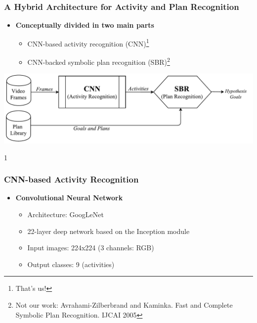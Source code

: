 \documentclass[usenames,dvipsnames]{beamer}
\def\masterclass{1}
\def\masterclass{0}
\begin{document}
\begin{frame}[c]\frametitle{A Hybrid Architecture for Activity and Plan Recognition}
   	\begin{itemize}
   		\item \textbf{Conceptually divided in two main parts}
   		\begin{itemize}
				\item CNN-based activity recognition (CNN)\footnote{That's us!}
                \item CNN-backed symbolic plan recognition (SBR)\footnote{Not our work: Avrahami-Zilberbrand and Kaminka. Fast and Complete Symbolic Plan Recognition. IJCAI 2005}
	    \end{itemize}
	\end{itemize}
	\begin{center}
		\includegraphics[width=0.8\linewidth]{fig/pipeline.pdf}
	\end{center}
\end{frame}

\if\masterclass1
\begin{frame}[c]\frametitle{CNN-based Activity Recognition}
   	\begin{itemize}
   		\item \textbf{Convolutional Neural Network}
   		\begin{itemize}
   		    \item Architecture: GoogLeNet
			\item 22-layer deep network based on the Inception module
            \item Input images: 224x224 (3 channels: RGB)
            \item Output classes: 9 (activities)
	    \end{itemize}
		
	\end{itemize}
\end{frame}
\end{document}
